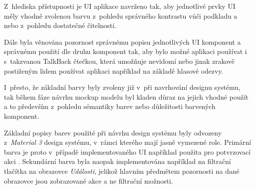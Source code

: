 \begin{minipage}[t]{0.45\textwidth}

\bigskip
{}
Z~hlediska přístupnosti je UI aplikace navrženo tak, aby jednotlivé prvky UI měly vhodně zvolenou barvu z~pohledu
správného kontrastu vůči podkladu a nebo z~pohledu dostatečné čitelnosti.

Dále byla věnována pozornost správnému popisu jednotlivých UI komponent a správnému použití dle druhu komponent tak, aby bylo možné aplikaci používat i
s~takzvanou TalkBack čtečkou, která umožňuje nevidomí nebo jinak zrakově postiženým lidem používat aplikaci například na základě hlasové odezvy.

\bigskip
{}
I~přesto, že základní barvy byly zvoleny již v~při navrhování designu systému, tak během fáze návrhu mockup modelu byl kladen důraz na jejich 
vhodné použít a to především z~pohledu sémantiky barev nebo důležitosti barvených komponent.


Základní popisy barev použité při návrhu design systému byly odvozeny z~\textit{Material 3} design systému, v~rámci kterého mají jasně 
vymezené role. \cite{m3ColorRoles}
Primární barva je proto v~případě implementovaného UI například použita pro potvrzovací akci . 
Sekundární barva byla naopak
implementována například na filtrační tlačítka na obrazovce \textit{Události}, jelikož hlavním předmětem pozornosti na dané obrazovce 
jsou zobrazované akce a ne filtrační možnosti.

\bigskip



\end{minipage}
\hfill
